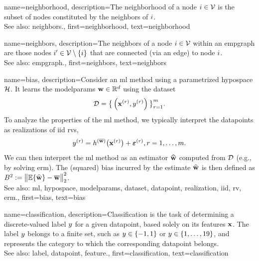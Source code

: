 {name={neighborhood},
	description={The neighborhood of a node $i \in \mathcal{V}$ is 
		the subset of nodes constituted by the \gls{neighbors} of $i$.
				\\ 
		See also: \gls{neighbors}.},
	first={neighborhood},
	text={neighborhood} 
}


{name={neighbors},
	description={The neighbors of a node $i \in \mathcal{V}$ 
		within an \gls{empgraph} are those nodes $i' \in \mathcal{V} \setminus \{ i\}$ that are connected (via an edge) to node $i$.
				\\ 
		See also: \gls{empgraph}.},
	first={neighbors},
	text={neighbors} 
}

{name={bias},
	description={Consider an \gls{ml} method using a parametrized \gls{hypospace} $\mathcal{H}$. 
		It learns the \gls{modelparams} ${\bf w} \in \mathbb{R}^{d}$ using the \gls{dataset} $$\mathcal{D}=\big\{ \left( {\bf x}^{(r)},y^{(r)} \right) \big\}_{r=1}^{m}.$$ 
		To analyze the properties of the \gls{ml} method, we typically interpret the \glspl{datapoint} as \glspl{realization} 
		of \gls{iid} \glspl{rv}, $$y^{(r)} = h^{(\overline{{\bf w}})}\big( {\bf x}^{(r)} \big) + \bm{\varepsilon}^{(r)}, r=1, \ldots, m.$$ 
		We can then interpret the \gls{ml} method as an estimator $\widehat{{\bf w}}$ 
		computed from $\mathcal{D}$ (e.g., by solving \gls{erm}). The (squared) bias incurred by the estimate $\widehat{{\bf w}}$ 
		is then defined as $B^{2} := \big\| \mathbb{E} \{ \widehat{{\bf w}}  \}- \overline{{\bf w}}\big\|_{2}^{2}$.
					\\ 
		See also: \gls{ml}, \gls{hypospace}, \gls{modelparams}, \gls{dataset}, \gls{datapoint}, \gls{realization}, \gls{iid}, \gls{rv}, \gls{erm}.},
	first={bias},
	text={bias} 
}

{name={classification},
	description={Classification is the task of determining a 
 		discrete-valued \gls{label} $y$ for a given \gls{datapoint}, based solely on its 
 		\glspl{feature} ${\bf x}$. The \gls{label} $y$ belongs to a finite set, such as 
 		$y \in \{-1,1\}$ or $y \in \{1, \ldots, 19\}$, and represents the 
 		category to which the corresponding \gls{datapoint} belongs.
				\\ 
		See also: \gls{label}, \gls{datapoint}, \gls{feature}.},
	first={classification},
	text={classification} 
}


